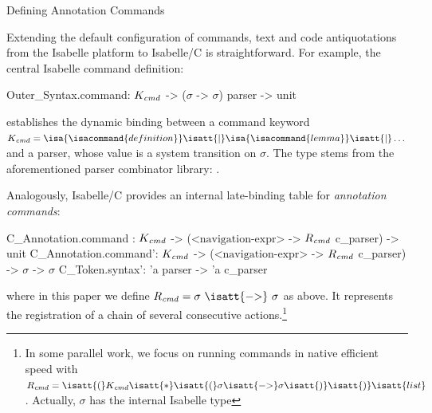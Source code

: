 \begin{isabellebody}
\begin{isamarkupsubsection*}
[label = {annot1},type = {scholarly_paper.technical}, args={label = {annot1},type = {scholarly_paper.technical}, scholarly_paper.text_section.main_author = {@{docitem ''fred''}}, Isa_COL.text_element.level = {}, Isa_COL.text_element.referentiable = {False}, Isa_COL.text_element.variants = {{STR ''outline'', STR ''document''}}, scholarly_paper.text_section.fixme_list = {}, Isa_COL.text_element.level = {}, scholarly_paper.technical.definition_list = {}}]Defining Annotation Commands%
\end{isamarkupsubsection*}\isamarkuptrue%
%
\begin{isamarkuptext}%
Extending the default configuration of commands, text and code antiquotations from the
Isabelle platform to Isabelle/C is straightforward. For example, the central Isabelle command
definition:
\begin{isar}
    Outer_Syntax.command: $K_\text{\emph{cmd}}$ -> ($\sigma$ -> $\sigma$) parser -> unit
\end{isar}
establishes the dynamic binding between a command keyword $K_\text{\emph{cmd}} =
\isa{\isacommand{definition}} \isatt{|}
\isa{\isacommand{lemma}} \isatt{|} \dots $ and a parser, whose value is
a system transition on $\sigma$. The  type stems from the
aforementioned parser combinator library: 
\isatt{=} .%
\end{isamarkuptext}\isamarkuptrue%
%
\begin{isamarkuptext}%
Analogously, Isabelle/C provides an internal late-binding table for
\emph{annotation commands}:
\begin{isar}
    C_Annotation.command : $K_\text{\emph{cmd}}$ -> ($\text{<navigation-expr>}$ -> $R_\text{\emph{cmd}}$ c_parser) -> unit
    C_Annotation.command': $K_\text{\emph{cmd}}$ -> ($\text{<navigation-expr>}$ -> $R_\text{\emph{cmd}}$ c_parser) -> $\sigma$ -> $\sigma$
    C_Token.syntax': 'a parser -> 'a c_parser
\end{isar}
where in this paper we define $R_\text{\emph{cmd}} = \sigma~\isatt{{\char`\-}{\char`\>}}~\sigma$ as
above. It represents the registration of a chain of several consecutive actions.\footnote{In
  some parallel work, we focus on running commands in native efficient speed with
  $R_\text{\emph{cmd}} = \isatt{(} K_\text{\emph{cmd}} \isatt{*}
  \isatt{(}\sigma \isatt{{\char`\-}{\char`\>}} \sigma \isatt{)}
  \isatt{)} \isatt{list}$ \cite{DBLP:journals/afp/TuongW15}. Actually, $\sigma$ has the internal Isabelle type
}
\end{isamarkuptext}
\end{isabellebody}
